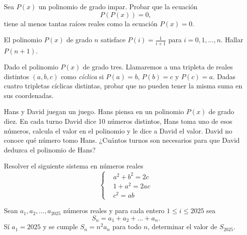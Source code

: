 \begin{problem-wos}
    Sea $P(x)$ un polinomio de grado impar.
    Probar que la ecuación
    \[
        P(P(x)) = 0,
    \]
    tiene al menos tantas raíces reales como la ecuación $P(x) = 0$.
\end{problem-wos}

\begin{problem-wos}
    El polinomio $P(x)$ de grado $n$ satisface $P(i) = \frac{1}{i + 1}$ para $i = 0,1, \ldots, n$.
    Hallar $P(n + 1)$.
\end{problem-wos}

\begin{problem-wos}
    Dado el polinomio $P(x)$ de grado tres.
    Llamaremos a una tripleta de reales distintos $(a, b, c)$ como \textit{cíclica} si $P(a) = b$, $P(b) = c$ y $P(c) = a$.
    Dadas cuatro tripletas cíclicas distintas, probar que no pueden tener la misma suma en sus coordenadas.
\end{problem-wos}

\begin{problem-wos}
    Hans y David juegan un juego.
    Hans piensa en un polinomio $P(x)$ de grado diez.
    En cada turno David dice 10 números distintos, Hans toma uno de esos números, calcula el valor en el polinomio y le dice a David el valor.
    David no conoce qué número tomo Hans.
    ¿Cuántos turnos son necesarios para que David deduzca el polinomio de Hans?
\end{problem-wos}

\begin{exercise}
    Resolver el siguiente sistema en números reales
    \[
        \begin{cases}
            & a^2 + b^2 = 2c\\
            & 1 + a^2 = 2ac\\
            & c^2 = ab
        \end{cases}
    \]
\end{exercise}

\begin{exercise}
    Sean $a_1, a_2, \ldots, a_{2025}$ números reales y para cada entero $1  \leq i \leq 2025$ sea
    \[
        S_n = a_1 + a_2 + \ldots + a_{n}.
    \]
    Sí $a_1 = 2025$ y se cumple $S_n = n^2 a_n$ para todo $n$, determinar el valor de $S_{2025}$.
\end{exercise}